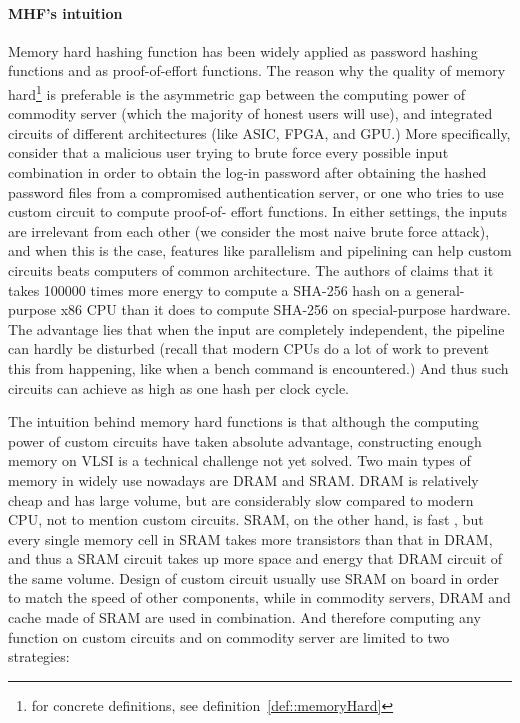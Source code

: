 \paragraph{MHF's intuition} Memory hard hashing function has been widely applied as password hashing functions and as proof-of-effort functions. The reason why the
quality of memory hard\footnote{for concrete definitions, see definition~\ref{def::memoryHard}} is preferable is the asymmetric gap between
the computing power of commodity server (which the majority of honest users will use), and integrated circuits of different architectures (like ASIC,
FPGA, and GPU.) More specifically, consider that a malicious user trying to brute force every possible input combination in order to obtain the log-in
password after obtaining the hashed password files from a compromised authentication server, or one who tries to use custom circuit to compute proof-of-%
effort functions. In either settings, the inputs are irrelevant from each other (we consider the most naive brute force attack), and when this is
the case, features like parallelism and pipelining can help custom circuits beats computers of common architecture. The authors of \cite{corrigan2016balloon}
claims that it takes 100000 times more energy to compute a SHA-256 hash on a
general-purpose x86 CPU than it does to compute SHA-256 on special-purpose hardware. The advantage lies that when the input are completely independent,
the pipeline can hardly be disturbed (recall that modern CPUs do a lot of work to prevent this from happening, like when a bench command is encountered.)
And thus such circuits can achieve as high as one hash per clock cycle.

The intuition behind memory hard functions is that although the computing power of custom circuits have taken absolute advantage, constructing enough memory
on VLSI is a technical challenge not yet solved. Two main types of memory in widely use nowadays are DRAM and SRAM. %
DRAM is relatively cheap and has large volume, but are considerably slow compared to modern CPU, not to mention custom circuits.
SRAM, on the other hand, is fast %
, but every single memory cell in SRAM takes more transistors than that in DRAM, and thus a SRAM circuit takes up more space and energy that DRAM circuit of the
same volume. Design of custom circuit usually use SRAM on board in order to match the speed of other components, while in commodity servers, DRAM and cache made
of SRAM are used in combination. And therefore computing any function on custom circuits and on commodity server are limited to two strategies:

